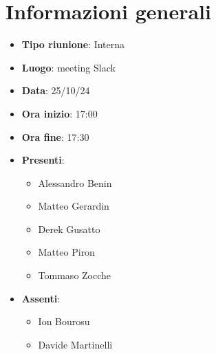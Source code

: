 \section{Informazioni generali}
\begin{itemize}
  \item \textbf{Tipo riunione}: Interna
  \item \textbf{Luogo}: meeting Slack
  \item \textbf{Data}: 25/10/24
  \item \textbf{Ora inizio}: 17:00
  \item \textbf{Ora fine}: 17:30
  
  \item \textbf{Presenti}:
  \begin{itemize}
    \item Alessandro Benin
    \item Matteo Gerardin
    \item Derek Gusatto
    \item Matteo Piron
    \item Tommaso Zocche
  \end{itemize}

  \item \textbf{Assenti}:
  \begin{itemize}
      \item Ion Bourosu
      \item Davide Martinelli
  \end{itemize}
 
\end{itemize}